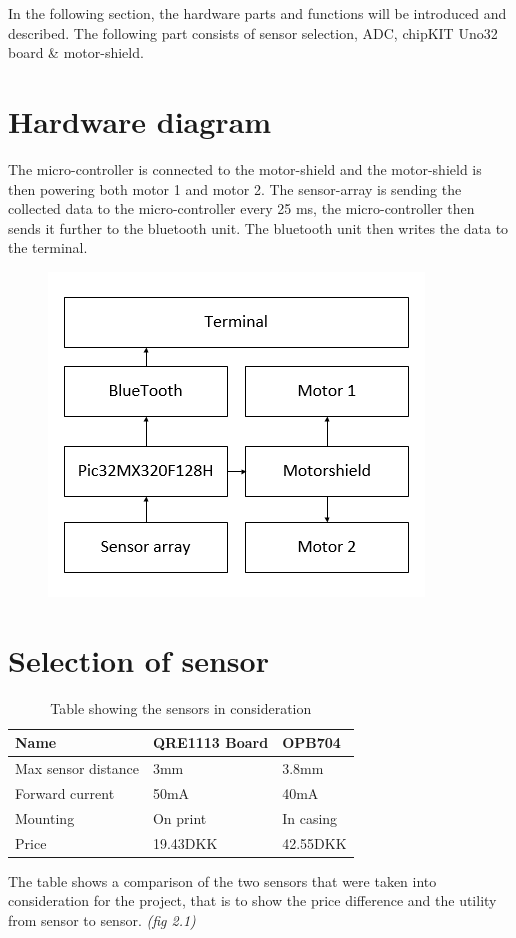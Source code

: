 In the following section, the hardware parts and functions will be introduced and described. The following part consists of sensor selection, ADC, chipKIT Uno32 board \& motor-shield.

\section{Hardware diagram}
The micro-controller is connected to the motor-shield and the motor-shield is then powering both motor 1 and motor 2. The sensor-array is sending the collected data to the micro-controller every 25 ms, the micro-controller then sends it further to the bluetooth unit. The bluetooth unit then writes the data to the terminal. 
\begin{figure}[!ht]
	\centering
	\includegraphics[width=.6\textwidth]{figures/hardwaredia2.png}
	\caption{}
	\label{Hardware diagram}
\end{figure}
    
\section{Selection of sensor}
\begin{table}[]
	\centering
	\label{Sensor table}
	\begin{tabular}{|l|l|l|}
		\hline
		Name                & QRE1113 Board & OPB704    \\ \hline
		Max sensor distance & 3mm           & 3.8mm     \\ \hline
		Forward current     & 50mA          & 40mA      \\ \hline
		Mounting            & On print      & In casing \\ \hline
		Price               & 19.43DKK      & 42.55DKK  \\ \hline
	\end{tabular}
	\caption{Table showing the sensors in consideration}
\end{table}
The table shows a comparison of the two sensors that were taken into consideration for the project, that is to show the price difference and the utility from sensor to sensor. \emph{(fig 2.1)}

